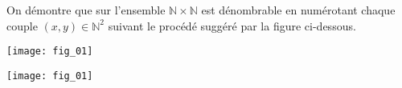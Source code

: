%
%
%
%
%


\setcounter{question}{0}

On démontre que sur l'ensemble $\mathbb{N}\times \mathbb{N}$ est dénombrable en numérotant chaque couple $(x,y)\in\mathbb{N}^2$ suivant le procédé suggéré par la figure ci-dessous.
\ifprof
\begin{center}
\texttt{[image: fig\_01]}
\end{center}
\else
\begin{marginfigure}
\texttt{[image: fig\_01]}
\end{marginfigure}
\fi

